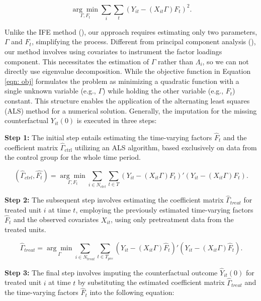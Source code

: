 \documentclass[12pt]{article}
\begin{document}
\begin{equation}
\label{eqn: obj}
\underset{\Gamma, F_t}{\arg\min} \sum_{i} \sum_{t}\left( Y_{it} - (X_{it}\Gamma) F_{t} \right)^2.
\end{equation}

Unlike the IFE method (\cite{bai2009panel}), our approach requires estimating only two parameters, $\Gamma$ and $F_t$, simplifying the process. Different from principal component analysis (\cite{jolliffe2002principal}), our method involves using covariates to instrument the factor loadings component. This necessitates the estimation of $\Gamma$ rather than $\Lambda_i$, so we can not directly use eigenvalue decomposition. While the objective function in Equation \ref{eqn: obj} formulates the problem as minimizing a quadratic function with a single unknown variable (e.g., $\Gamma$) while holding the other variable (e.g., $F_t$) constant. This structure enables the application of the alternating least squares (ALS) method for a numerical solution. Generally, the imputation for the missing counterfactual $Y_{it}(0)$ is executed in three steps:

\textbf{Step 1:} The initial step entails estimating the time-varying factors $\hat{F}_t$ and the coefficient matrix $\hat{\Gamma}_{\text{ctrl}}$ utilizing an ALS algorithm, based exclusively on data from the control group for the whole time period.

\begin{equation}
(\hat{\Gamma}_{ctrl}, \hat{F_t}) = \underset{\Gamma, F_t}{\arg\min} \sum_{i \in N_{ctrl}} \sum_{t \in T}\left( Y_{it} - (X_{it}\Gamma) F_{t} \right)'\left( Y_{it} - (X_{it}\Gamma) F_{t} \right).
\tag{3}
\label{eq: optimization}
\end{equation}

\textbf{Step 2:} The subsequent step involves estimating the coefficient matrix $\hat{\Gamma}_{treat}$ for treated unit $i$ at time $t$, employing the previously estimated time-varying factors $\hat{F}_t$ and the observed covariates $X_{it}$, using only pretreatment data from the treated units.

\begin{equation}
\hat{\Gamma}_{treat} = \underset{\Gamma}{\arg\min} \sum_{i \in N_{treat}} \sum_{t \in T_{pre}} \left( Y_{it} - (X_{it} \Gamma) \hat{F}_{t} \right)' \left( Y_{it} - (X_{it} \Gamma) \hat{F}_{t} \right).
\tag{4}
\end{equation}

\textbf{Step 3:} The final step involves imputing the counterfactual outcome $\hat{Y}_{it}(0)$ for treated unit $i$ at time $t$ by substituting the estimated coefficient matrix $\hat{\Gamma}_{treat}$ and the time-varying factors $\hat{F}_t$ into the following equation:
\end{document}
